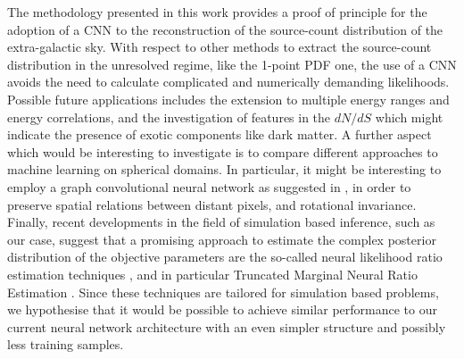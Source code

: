  The methodology presented in this work provides a proof of principle for the adoption of a CNN to the reconstruction of the source-count distribution of the extra-galactic sky. 
With respect to other methods to extract the source-count distribution in the unresolved regime, like the 1-point PDF one, the use of a CNN avoids the need to calculate complicated and numerically demanding likelihoods.
 Possible future applications includes the extension to multiple energy ranges and energy correlations, and the investigation of features in the $dN/dS$ which might indicate the presence of exotic components like dark matter.
A further aspect which would be interesting to investigate is to compare different approaches to machine learning on spherical domains. In particular, it might be interesting to employ a graph convolutional neural network as suggested in \cite{DBLP:journals/corr/abs-2012-15000}, in order to preserve spatial relations between distant pixels, and rotational invariance.
Finally, recent developments in the field of simulation based inference, such as our case, suggest that a promising approach to estimate the complex posterior distribution of the objective parameters are the so-called neural likelihood ratio estimation techniques \cite{Durkan2020}, and in particular Truncated Marginal Neural Ratio Estimation \cite{Miller2021arxiv,Miller2021,AnauMontel:2022ppb}. Since these techniques are tailored for simulation based problems, we hypothesise that it would be possible to achieve similar performance to our current neural network architecture with an even simpler structure and possibly less training samples. 
 
 

\label{sec:dnds:conclusions}

